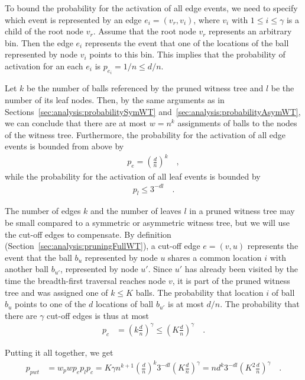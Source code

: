 \documentclass[a4paper,12pt]{article}
\begin{document}
To bound the probability for the activation of all edge events, we need to specify which event is represented by an edge $e_i = (v_r, v_i)$, where $v_i$ with $1 \leq i \leq \gamma$ is a child of the root node $v_r$. Assume that the root node $v_r$ represents an arbitrary bin. Then the edge $e_i$ represents the event that one of the locations of the ball represented by node $v_i$ points to this bin. This implies that the probability of activation for an each $e_i$ is $p_{e_i} = 1/n \leq d/n$. 

Let $k$ be the number of balls referenced by the pruned witness tree and $l$ be the number of its leaf nodes. Then, by the same arguments as in Sections~\ref{sec:analysis:probabilitySymWT} and~\ref{sec:analysis:probabilityAsymWT}, we can conclude that there are at most $w=n^k$ assignments of balls to the nodes of the witness tree. Furthermore, the probability for the activation of all edge events is bounded from above by 
\begin{align*}
p_e = \left(\frac{d}{n}\right)^{k}\quad ,
\end{align*}
while the probability for the activation of all leaf events is bounded by 
\begin{align*}
p_l \leq 3^{-d l}\quad .
\end{align*} 

The number of edges $k$ and the number of leaves $l$ in a pruned witness tree may be small compared to a symmetric or asymmetric witness tree, but we will use the cut-off edges to compensate. By definition (Section~\ref{sec:analysis:pruningFullWT}), a cut-off edge $e=(v, u)$ represents the event that the ball $b_u$ represented by node $u$ shares a common location $i$ with another ball $b_{u'}$, represented by node $u'$. Since $u'$ has already been visited by the time the breadth-first traversal reaches node $v$, it is part of the pruned witness tree and was assigned one of $k\leq K$ balls. The probability that location $i$ of ball $b_u$ points to one of the $d$ locations of ball $b_{u'}$ is at most $d/n$. The probability that there are $\gamma$ cut-off edges is thus at most 
\begin{align*}
p_c &= \left(k \frac{d}{n}\right)^\gamma 
    \leq \left(K \frac{d}{n}\right)^\gamma \quad .
\end{align*}

Putting it all together, we get 
\begin{align*}
p_{pwt} &= w_p w  p_e  p_l  p_c 
		= K\gamma n^{k+1} \left(\frac{d}{n}\right)^k3^{-d l}  \left(K \frac{d}{n}\right)^\gamma
		= n  d^k 3^{-d l}  \left(K^2 \frac{d}{n} \right)^\gamma \quad .
\end{align*}
\end{document}
